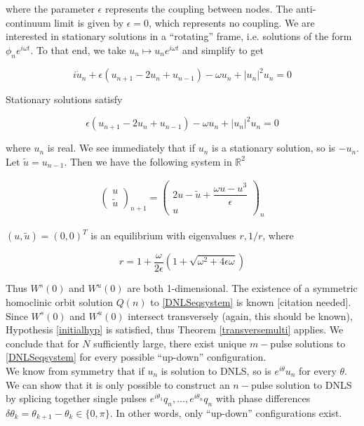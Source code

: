 \documentclass[12pt]{article}
\def\R{{\mathbb R}}
\begin{document}
where the parameter $\epsilon$ represents the coupling between nodes. The anti-continuum limit is given by $\epsilon = 0$, which represents no coupling. We are interested in stationary solutions in a ``rotating'' frame, i.e. solutions of the form $\phi_n e^{i \omega t}$. To that end, we take $u_n \mapsto u_n e^{i \omega t}$ and simplify to get

\begin{equation}\label{dNLSomega}
i\dot{u}_n + \epsilon(u_{n+1} - 2 u_n + u_{n-1}) - \omega u_n + |u_n|^2 u_n = 0
\end{equation}

Stationary solutions satisfy

\begin{equation}
\epsilon(u_{n+1} - 2 u_n + u_{n-1}) - \omega u_n + |u_n|^2 u_n = 0
\end{equation}

where $u_n$ is real. We see immediately that if $u_n$ is a stationary solution, so is $-u_n$. Let $\tilde{u} = u_{n-1}$. Then we have the following system in $\R^2$

\begin{align}\label{DNLSeqsystem}
\begin{pmatrix}u \\ \tilde{u} \end{pmatrix}_{n+1} =
\begin{pmatrix}2 u - \tilde{u} + \dfrac{\omega u - u^3}{\epsilon} \\ u \end{pmatrix}_n
\end{align}

$(u, \tilde{u}) = (0, 0)^T$ is an equilibrium with eigenvalues $r, 1/r$, where

\[
r = 1 + \frac{\omega}{2 \epsilon}\left( 1 + \sqrt{\omega^2 + 4 \epsilon \omega } \right)
\]

Thus $W^s(0)$ and $W^u(0)$ are both 1-dimensional. The existence of a symmetric homoclinic orbit solution $Q(n)$ to \eqref{DNLSeqsystem} is known [citation needed]. Since $W^s(0)$ and $W^u(0)$ intersect transversely (again, this should be known), Hypothesis \ref{initialhyp} is satisfied, thus Theorem \ref{transversemulti} applies. We conclude that for $N$ sufficiently large, there exist unique $m-$pulse solutions to \eqref{DNLSeqsystem} for every possible ``up-down'' configuration.\\

We know from symmetry that if $u_n$ is solution to DNLS, so is $e^{i \theta} u_n$ for every $\theta$. We can show that it is only possible to construct an $n-$pulse solution to DNLS by splicing together single pulses $e^{i \theta_1}q_n, \dots, e^{i \theta_n}q_n$ with phase differences $\delta \theta_k = \theta_{k+1} - \theta_k \in \{ 0, \pi \}$. In other words, only ``up-down'' configurations exist.
\end{document}
